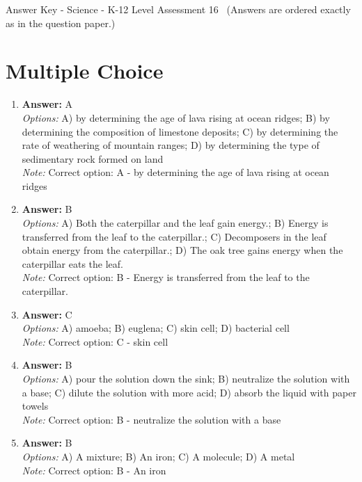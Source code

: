 \documentclass[12pt]{article}
\begin{document}
\begin{center}
Answer Key - Science - K-12 Level Assessment 16 \
\small (Answers are ordered exactly as in the question paper.)
\end{center}

\section*{Multiple Choice}
\begin{enumerate}[label=\arabic*.]
\item \textbf{Answer:} A
\\ \textit{Options:} A) by determining the age of lava rising at ocean ridges; B) by determining the composition of limestone deposits; C) by determining the rate of weathering of mountain ranges; D) by determining the type of sedimentary rock formed on land
\\ \textit{Note:} Correct option: A - by determining the age of lava rising at ocean ridges
\item \textbf{Answer:} B
\\ \textit{Options:} A) Both the caterpillar and the leaf gain energy.; B) Energy is transferred from the leaf to the caterpillar.; C) Decomposers in the leaf obtain energy from the caterpillar.; D) The oak tree gains energy when the caterpillar eats the leaf.
\\ \textit{Note:} Correct option: B - Energy is transferred from the leaf to the caterpillar.
\item \textbf{Answer:} C
\\ \textit{Options:} A) amoeba; B) euglena; C) skin cell; D) bacterial cell
\\ \textit{Note:} Correct option: C - skin cell
\item \textbf{Answer:} B
\\ \textit{Options:} A) pour the solution down the sink; B) neutralize the solution with a base; C) dilute the solution with more acid; D) absorb the liquid with paper towels
\\ \textit{Note:} Correct option: B - neutralize the solution with a base
\item \textbf{Answer:} B
\\ \textit{Options:} A) A mixture; B) An iron; C) A molecule; D) A metal
\\ \textit{Note:} Correct option: B - An iron
\end{enumerate}
\end{document}
